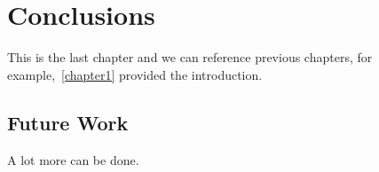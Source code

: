 \chapter{Conclusions} \label{chapter4}

This is the last chapter and we can reference previous chapters, for example,~\autoref{chapter1} provided the introduction.

\section{Future Work} \label{futurework}

A lot more can be done.
